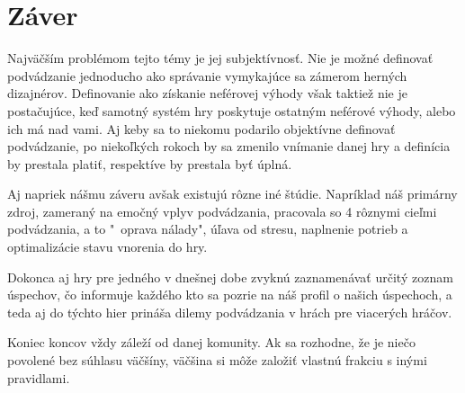 \documentclass[10pt, oneside, slovak,a4paper]{article}
\begin{document}
\section{Záver} 

Najväčším problémom tejto témy je jej subjektívnosť. Nie je možné definovať podvádzanie jednoducho ako správanie vymykajúce sa zámerom herných dizajnérov. Definovanie ako získanie neférovej výhody však taktiež nie je postačujúce, keď samotný systém hry poskytuje ostatným neférové výhody, alebo ich má nad vami. Aj keby sa to niekomu podarilo objektívne definovať podvádzanie, po niekoľkých rokoch by sa zmenilo vnímanie danej hry a definícia by prestala platiť, respektíve by prestala byť úplná.

Aj napriek nášmu záveru avšak existujú rôzne iné štúdie. Napríklad náš primárny zdroj, zameraný na emočný vplyv podvádzania, pracovala so 4 rôznymi cieľmi podvádzania, a to "\ oprava nálady", úľava od stresu, naplnenie potrieb a optimalizácie stavu vnorenia do hry\cite{mood}. 

Dokonca aj hry pre jedného v dnešnej dobe zvyknú zaznamenávať určitý zoznam úspechov, čo informuje každého kto sa pozrie na náš profil o našich úspechoch, a teda aj do týchto hier prináša dilemy podvádzania v hrách pre viacerých hráčov.

Koniec koncov vždy záleží od danej komunity. Ak sa rozhodne, že je niečo povolené bez súhlasu väčšíny, väčšina si môže založiť vlastnú frakciu s inými pravidlami.


\nocite{*}



\end{document}
